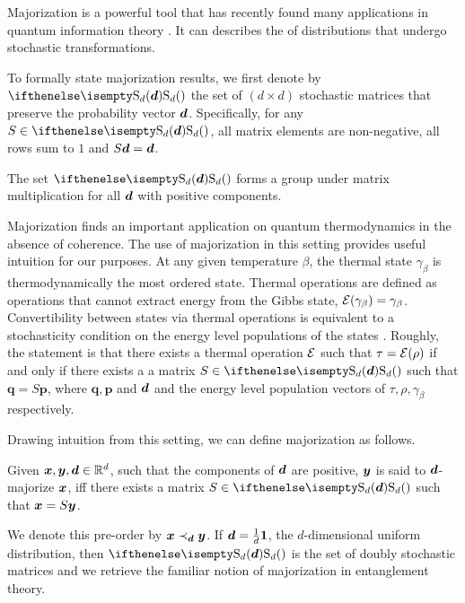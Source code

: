 \documentclass[pra,
aps,
twocolumn,
superscriptaddress,
groupedaddress,
nofootinbib,
reprint
]{revtex4-1}
\begin{document}
Majorization is a powerful tool that has recently found many applications in quantum information theory .
It can describes the  of distributions that undergo stochastic transformations.

To formally state majorization results, we first denote by $\stoch$ the set of $(d \times d)$ stochastic matrices that preserve the probability vector $\bm{d}$. 
Specifically, for any $S \in \stoch$, all matrix elements are non-negative, all rows sum to $1$ and $S\bm{d} = \bm{d}$.

The set $\stoch$ forms a group under matrix multiplication for all $\bm{d}$ with positive components.

Majorization finds an important application on quantum thermodynamics in the absence of coherence.
The use of majorization in this setting provides useful intuition for our purposes.
At any given temperature $\beta$, the thermal state $\gamma_\beta$ is thermodynamically the most ordered state. 
Thermal operations are defined as operations that cannot extract energy from the Gibbs state, $\mathcal{E}(\gamma_\beta) = \gamma_\beta$.
Convertibility between states via thermal operations is equivalent to a stochasticity condition on the energy level populations of the states .
Roughly, the statement is that there exists a thermal operation $\mathcal{E}$ such that $\tau = \mathcal{E}(\rho)$ if and only if there exists a a matrix $S \in \stoch$ such that $\bm{q} = S\bm{p}$, where $\bm{q}, \bm{p}$ and $\bm{d}$ and the energy level population vectors of $\tau, \rho, \gamma_\beta$ respectively.

Drawing intuition from this setting, we can define majorization as follows.
\begin{definition}\label{def:dmajor}
    Given $\bm{x}, \bm{y}, \bm{d} \in \mathbb{R}^d$, such that the components of $\bm{d}$ are positive, $\bm{y}$ is said to $\bm{d}$-majorize $\bm{x}$, iff there exists a matrix $S \in \stoch$ such that $\bm{x} = S\bm{y}$.
\end{definition}
We denote this pre-order by $\bm{x} \prec_{\bm{d}} \bm{y}$.
If $\bm{d} = \frac{1}{d}\bm{1}$, the $d$-dimensional uniform distribution, then $\stoch$ is the set of doubly stochastic matrices and we retrieve the familiar notion of majorization in entanglement theory. 
\end{document}
